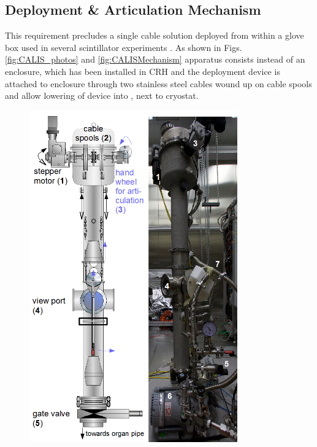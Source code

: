 \subsection{Deployment \& Articulation Mechanism}\label{sec:DeploymentArticulation}
This requirement precludes a single cable solution deployed from within a glove box used in several scintillator experiments \cite{Banks:2014hra, Huang:2013uxa}. %
As shown in Figs. \ref{fig:CALIS_photos} and \ref{fig:CALISMechanism} apparatus consists instead of an enclosure, which has been installed in CRH and the deployment device is attached to enclosure through two stainless steel cables wound up on cable spools and allow lowering of device into \lsv, next to cryostat.
\begin{figure}[htbp]
 \centering
\includegraphics[width=0.8\textwidth]{Figures/CALIS_overview.png}

\end{figure}
